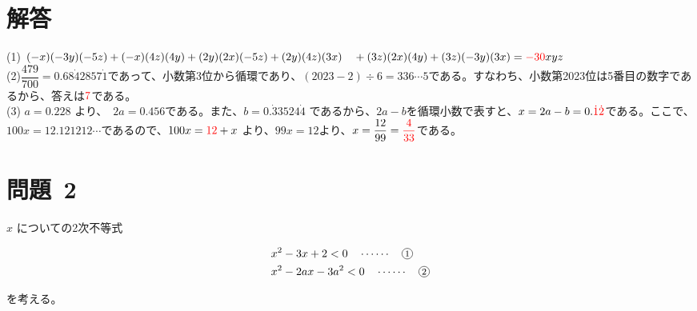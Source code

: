 \documentclass[dvipdfmx,a4paper,12pt]{jarticle}
\theoremstyle{mystyle}
\newcommand{\maru}[1]{\tikz[baseline=-0.7ex]{
    \node[shape=circle,draw,inner sep=1pt,minimum size=5pt,anchor=center] {\footnotesize #1};}}
\begin{document}
\newpage
\section*{\textbf{解答}}
(1) \quad $(-x)(-3y)(-5z) + (-x)(4z)(4y) + (2y)(2x)(-5z) + (2y)(4z)(3x) \\
\quad + (3z)(2x)(4y) + (3z)(-3y)(3x) = {\color{red}{-30}}xyz$\\[0.5em]

(2)\quad $\dfrac{479}{700} = 0.68\dot{4}2857\dot{1} $であって、小数第3位から循環であり、$(2023-2) \div 6 = 336 \cdots 5 $である。すなわち、小数第2023位は5番目の数字であるから、答えは$\color{red}7$である。\\[0.5em]

(3) \quad $a = 0.228$ より、　$2a = 0.456$である。また、$b = 0.\dot{3}3524\dot{4}$ であるから、$2a-b$を循環小数で表すと、$x=2a-b=0.\color{red}\dot{1}\dot{2}$である。ここで、$100x=12.121212\cdots$であるので、$100x={\color{red}{12}}+x$
より、$99x=12$より、$x=\dfrac{12}{99}=\color{red}\dfrac{4}{33}$である。

\newpage
\section*{\textbf{問題\, 2}}
$x$ についての2次不等式

\begin{align*}
&x^2 - 3x + 2 < 0 \quad \cdots\cdots \quad \maru{1} \\
&x^2 - 2ax - 3a^2 < 0 \quad \cdots\cdots \quad \maru{2}
\end{align*}

を考える。
\end{document}
